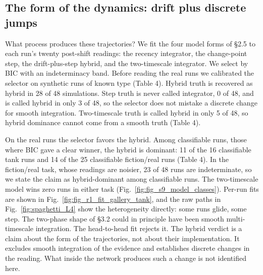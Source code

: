 \documentclass[11pt]{article}
\begin{document}
\subsection{The form of the dynamics: drift plus discrete jumps}

What process produces these trajectories? We fit the four model forms of \S2.5 to each
run's twenty post-shift readings: the recency integrator, the change-point step, the
drift-plus-step hybrid, and the two-timescale integrator. We select by BIC with an
indeterminacy band. Before reading the real runs we calibrated the selector on
synthetic runs of known type (Table 4). Hybrid truth is recovered as hybrid in 28 of 48 simulations. Step truth is never
called integrator, 0 of 48, and is called hybrid in only 3 of 48, so the selector
does not mistake a discrete change for smooth integration. Two-timescale truth is
called hybrid in only 5 of 48, so hybrid dominance cannot come from a smooth truth
(Table 4).

On the real runs the selector favors the hybrid. Among classifiable runs, those where BIC gave a clear winner, the hybrid is
dominant: 11 of the 16 classifiable tank runs and 14 of the 25 classifiable
fiction/real runs (Table 4). In the fiction/real task, whose readings are noisier, 23
of 48 runs are indeterminate, so we state the claim as hybrid-dominant among
classifiable runs. The two-timescale model wins zero runs in either task (Fig.~\ref{fig:fig_s9_model_classes}). Per-run fits are shown in Fig.~\ref{fig:fig_r1_fit_gallery_tank}, and the
raw paths in Fig.~\ref{fig:spaghetti_L4} show the heterogeneity directly: some runs glide, some
step. The two-phase shape of \S3.2 could in principle have been smooth multi-timescale
integration. The head-to-head fit rejects it. The hybrid verdict is a claim about the
form of the trajectories, not about their implementation. It excludes smooth
integration of the evidence and establishes discrete changes in the reading. What
inside the network produces such a change is not identified here.
\end{document}
